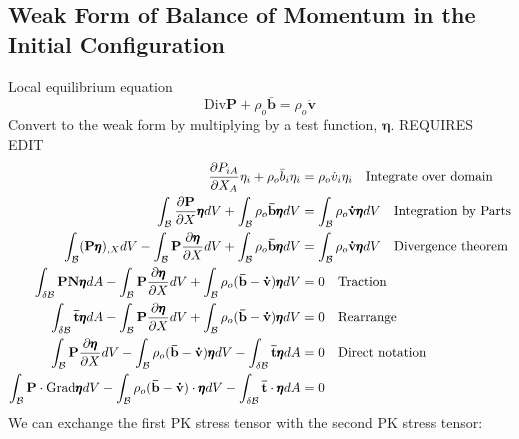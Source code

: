 \documentclass[12pt,3p]{article}
\numberwithin{equation}{section}
\begin{document}
\subsection{Weak Form of Balance of Momentum in the Initial Configuration}
Local equilibrium equation
\begin{equation}
\text{Div} \mathbf{P} + \rho_o \mathbf{\bar{b}} = \rho_o \mathbf{\dot{v}}
\end{equation}
Convert to the weak form by multiplying by a test function, $\pmb{\eta}$. REQUIRES EDIT
\begin{align}\label{356}
\begin{split}
\pdv{P_{iA}}{X_A} \eta_i + \rho_o \bar{b}_i \eta_i &= \rho_o \dot{v}_i \eta_i \quad \text{Integrate over domain} \\
\int_{\mathcal{B}} \pdv{\mathbf{P}}{X} \pmb{\eta} dV + \int_{\mathcal{B}} \rho_o \mathbf{\bar{b}} \pmb{\eta} dV &= \int_{\mathcal{B}} \rho_o \mathbf{\dot{v}} \pmb{\eta} dV \quad \text{Integration by Parts} \\
\int_{\mathcal{B}} (\mathbf{P} \pmb{\eta})_{,X} dV - \int_{\mathcal{B}}\mathbf{P} \pdv{\pmb{\eta}}{X} dV + \int_{\mathcal{B}} \rho_o \mathbf{\bar{b}} \pmb{\eta} dV &= \int_{\mathcal{B}} \rho_o \mathbf{\dot{v}} \pmb{\eta} dV \quad \text{Divergence theorem} \\
\int_{\delta \mathcal{B}} \mathbf{P} \mathbf{N} \pmb{\eta} dA - \int_{\mathcal{B}}\mathbf{P} \pdv{\pmb{\eta}}{X} dV + \int_{\mathcal{B}} \rho_o (\mathbf{\bar{b}} - \mathbf{\dot{v}}) \pmb{\eta} dV &= 0 \quad \text{Traction} \\
\int_{\delta \mathcal{B}} \mathbf{\bar{t}} \pmb{\eta} dA - \int_{\mathcal{B}}\mathbf{P} \pdv{\pmb{\eta}}{X} dV + \int_{\mathcal{B}} \rho_o (\mathbf{\bar{b}} - \mathbf{\dot{v}}) \pmb{\eta} dV &= 0 \quad \text{Rearrange} \\
\int_{\mathcal{B}} \mathbf{P} \pdv{\pmb{\eta}}{X} dV - \int_{\mathcal{B}} \rho_o (\mathbf{\bar{b}} - \mathbf{\dot{v}}) \pmb{\eta} dV - \int_{\delta \mathcal{B}} \mathbf{\bar{t}} \pmb{\eta} dA &= 0 \quad \text{Direct notation} \\
\int_{\mathcal{B}} \mathbf{P} \cdot \text{Grad} \pmb{\eta} dV - \int_{\mathcal{B}} \rho_o (\mathbf{\bar{b}} - \mathbf{\dot{v}}) \cdot \pmb{\eta} dV - \int_{\delta \mathcal{B}} \mathbf{\bar{t}} \cdot \pmb{\eta} dA &= 0
\end{split}
\end{align}
We can exchange the first PK stress tensor with the second PK stress tensor:
\end{document}
